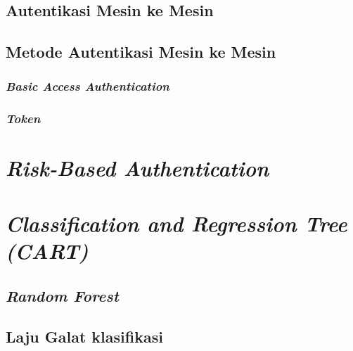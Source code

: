 \documentclass[ugmtesis]{ugmtesis}
\begin{document}
		\subsection{Autentikasi Mesin ke Mesin}
		\label{autentikasi mesin ke mesin}
		

		\subsection{Metode Autentikasi Mesin ke Mesin}
		\label{metode autentikasi mesin ke mesin}
		

			\subsubsection{\textit{Basic Access Authentication}}
			\label{basic access authentication}
			

			\subsubsection{\textit{Token}}
			\label{token}
			

	\section{\textit{Risk-Based Authentication}}
	\label{risk-based authentication}
	

	\section{\textit{Classification and Regression Tree (CART)}}
	\label{classification and regression tree}
	

		\subsection{\textit{Random Forest}}
		\label{random forest}
		

		\subsection{Laju Galat klasifikasi}
		\label{laju galat klasifikasi}
		
\end{document}
